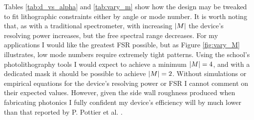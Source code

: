 \documentclass{article}
\begin{document}
    Tables \ref{tab:d_vs_alpha} and \ref{tab:vary_m} show how the design may be tweaked to fit lithographic constraints either by angle or mode number. It is worth noting that, as with a traditional spectrometer, with increasing $\abs{M}$ the device's resolving power increases, but the free spectral range decreases. For my applications I would like the greatest FSR possible, but as Figure \ref{fig:vary_M} illustrates, low mode numbers require extremely tight patterns. Using the school's photolithography tools I would expect to achieve a minimum $\abs{M} = 4$, and with a dedicated mask it should be possible to achieve $\abs{M} = 2$. Without simulations or empirical equations for the device's resolving power or FSR I cannot comment on their expected values. However, given the side wall roughness produced when fabricating photonics I fully confident my device's efficiency will by much lower than that reported by P. Pottier et al. \cite{Packirisamy2012Mono-OrderGrating}.
    
\clearpage
\newpage



\end{document}
